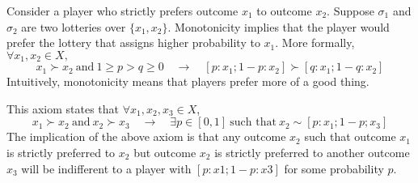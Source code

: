 \begin{ax}[Monotonicity]
	Consider a player who strictly prefers outcome $x_1$ to outcome $x_2$.
	Suppose $\sigma_1$ and $\sigma_2$ are two lotteries over $\{x_1, x_2\}$.
	Monotonicity implies that the player would prefer the lottery that assigns higher probability to $x_1$.
	More formally, $\forall x_1, x_2 \in X,$
	\[x_1\succ x_2 \ \text{and}\ 1\geq p > q\geq 0 \quad\rightarrow\quad [p:x_1;1-p:x_2]\succ[q:x_1;1-q:x_2]\]
	Intuitively, monotonicity means that players prefer more of a good thing.
\end{ax}
\begin{ax}[Continuity]
	This axiom states that $\forall x_1, x_2, x_3 \in X$,
	\[x_1\succ x_2 \ \text{and}\ x_2\succ x_3 \quad\rightarrow\quad \exists p\in[0,1]\ \text{such that}\ x_2 \sim[p:x_1;1-p;x_3]\]
	The implication of the above axiom is that any outcome $x_2$ such that outcome $x_1$ is strictly preferred to $x_2$ but outcome $x_2$ is strictly preferred to another outcome $x_3$ will be indifferent to a player with $[p : x1; 1 - p : x3]$ for some probability $p$.
\end{ax}
